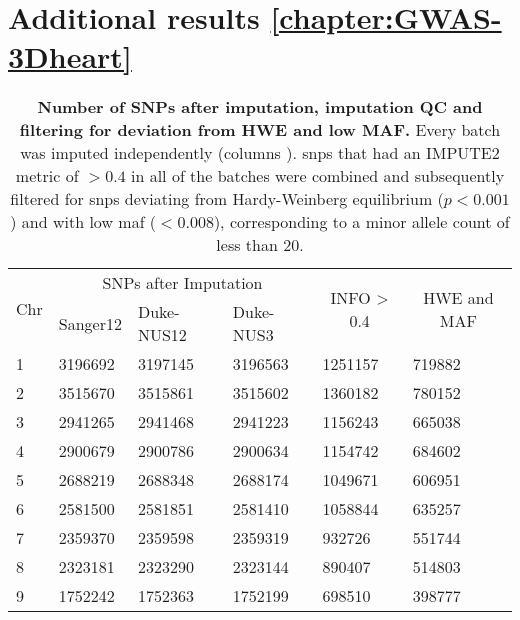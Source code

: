 \section{Additional results \cref{chapter:GWAS-3Dheart}}
\begin{table}[htbp]
  \centering
  \caption[\textbf{Number of SNPs after imputation, imputation QC and filtering for deviation from HWE and low MAF. }]{\textbf{Number of SNPs after imputation, imputation QC and filtering for deviation from HWE and low MAF. } Every batch was imputed independently (columns ). \glspl{snp} that had an IMPUTE2  metric of \(> 0.4\) in all of the batches were combined and subsequently filtered for \glspl{snp} deviating from Hardy-Weinberg equilibrium (\(p <0.001\)) and with low \gls{maf} (\(< 0.008\)), corresponding to a minor allele count of less than \num{20}. }
    \begin{tabular}{llllll}
    \toprule
    \multicolumn{1}{c}{\multirow{2}[4]{*}{Chr}} & \multicolumn{3}{c}{SNPs after Imputation} & \multicolumn{1}{c}{\multirow{2}[4]{*}{ INFO > 0.4}} & \multicolumn{1}{c}{\multirow{2}[4]{*}{HWE and MAF}} \\
\cmidrule{2-4}          & Sanger12 & Duke-NUS12 & Duke-NUS3 &       &  \\
    \midrule
    \num{1} & \num{3196692} & \num{3197145} & \num{3196563} & \num{1251157} & \num{719882} \\
    \num{2} & \num{3515670} & \num{3515861} & \num{3515602} & \num{1360182} & \num{780152} \\
    \num{3} & \num{2941265} & \num{2941468} & \num{2941223} & \num{1156243} & \num{665038} \\
    \num{4} & \num{2900679} & \num{2900786} & \num{2900634} & \num{1154742} & \num{684602} \\
    \num{5} & \num{2688219} & \num{2688348} & \num{2688174} & \num{1049671} & \num{606951} \\
    \num{6} & \num{2581500} & \num{2581851} & \num{2581410} & \num{1058844} & \num{635257} \\
    \num{7} & \num{2359370} & \num{2359598} & \num{2359319} & \num{932726} & \num{551744} \\
    \num{8} & \num{2323181} & \num{2323290} & \num{2323144} & \num{890407} & \num{514803} \\
    \num{9} & \num{1752242} & \num{1752363} & \num{1752199} & \num{698510} & \num{398777} \\

\end{tabular}
\end{table}
